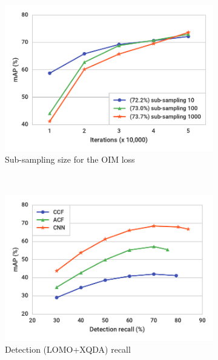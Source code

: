 \begin{figure}[t]
\begin{center}
\begin{subfigure}[t]{0.32\linewidth}
  \includegraphics[width=\linewidth]{figures/person_search/subsampling.pdf}
  \caption{Sub-sampling size for the OIM loss}
  \label{fig:subsampling}
\end{subfigure}
~
\begin{subfigure}[t]{0.32\linewidth}
  \includegraphics[width=\linewidth]{figures/person_search/factor-recall.pdf}
  \caption{Detection (LOMO+XQDA) recall}
  \label{fig:factor-recall}
\end{subfigure}
~
\begin{subfigure}[t]{0.32\linewidth}

\end{subfigure}
\end{center}
\end{figure}
